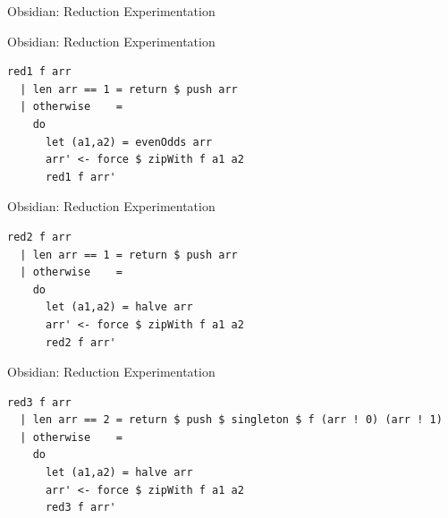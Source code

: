 \documentclass[xcolor=dvipsnames]{beamer}
\begin{document}
%

\begin{frame}{Obsidian: Reduction Experimentation}

  


\end{frame} 


\begin{frame}[fragile]{Obsidian: Reduction Experimentation}

  \begin{block}{} 
    
\Fontvi
\begin{verbatim}
red1 f arr
  | len arr == 1 = return $ push arr
  | otherwise    = 
    do
      let (a1,a2) = evenOdds arr
      arr' <- force $ zipWith f a1 a2
      red1 f arr'
\end{verbatim} 
    
  \end{block}

\end{frame} 

\begin{frame}[fragile]{Obsidian: Reduction Experimentation}

  \begin{block}{} 
    
\Fontvi
\begin{verbatim}
red2 f arr
  | len arr == 1 = return $ push arr
  | otherwise    = 
    do
      let (a1,a2) = halve arr
      arr' <- force $ zipWith f a1 a2
      red2 f arr'   
\end{verbatim} 
    
  \end{block}

\end{frame} 

\begin{frame}[fragile]{Obsidian: Reduction Experimentation}

  \begin{block}{} 
    
\Fontvi
\begin{verbatim}
red3 f arr
  | len arr == 2 = return $ push $ singleton $ f (arr ! 0) (arr ! 1) 
  | otherwise    = 
    do
      let (a1,a2) = halve arr
      arr' <- force $ zipWith f a1 a2
      red3 f arr'   
\end{verbatim} 
    
  \end{block}

\end{frame} 
\end{document}
